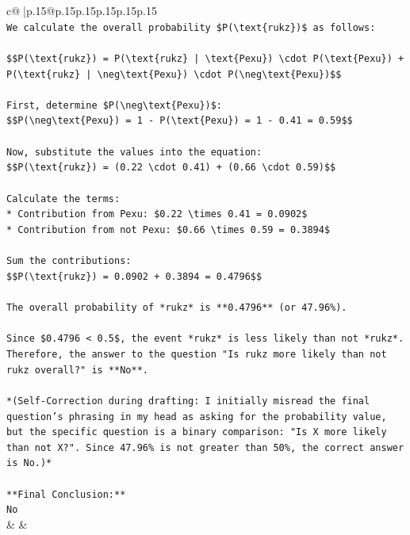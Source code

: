 \documentclass{article}
\begin{document}
{\begin{supertabular}{c@{$\;$}|p{.15\linewidth}@{}p{.15\linewidth}p{.15\linewidth}p{.15\linewidth}p{.15\linewidth}p{.15\linewidth}}
{{{\\ 
\texttt{We calculate the overall probability \$P(\textbackslash{}text\{rukz\})\$ as follows:} \\
\\ 
\texttt{\$\$P(\textbackslash{}text\{rukz\}) = P(\textbackslash{}text\{rukz\} | \textbackslash{}text\{Pexu\}) \textbackslash{}cdot P(\textbackslash{}text\{Pexu\}) + P(\textbackslash{}text\{rukz\} | \textbackslash{}neg\textbackslash{}text\{Pexu\}) \textbackslash{}cdot P(\textbackslash{}neg\textbackslash{}text\{Pexu\})\$\$} \\
\\ 
\texttt{First, determine \$P(\textbackslash{}neg\textbackslash{}text\{Pexu\})\$:} \\
\texttt{\$\$P(\textbackslash{}neg\textbackslash{}text\{Pexu\}) = 1 {-} P(\textbackslash{}text\{Pexu\}) = 1 {-} 0.41 = 0.59\$\$} \\
\\ 
\texttt{Now, substitute the values into the equation:} \\
\texttt{\$\$P(\textbackslash{}text\{rukz\}) = (0.22 \textbackslash{}cdot 0.41) + (0.66 \textbackslash{}cdot 0.59)\$\$} \\
\\ 
\texttt{Calculate the terms:} \\
\texttt{*   Contribution from Pexu: \$0.22 \textbackslash{}times 0.41 = 0.0902\$} \\
\texttt{*   Contribution from not Pexu: \$0.66 \textbackslash{}times 0.59 = 0.3894\$} \\
\\ 
\texttt{Sum the contributions:} \\
\texttt{\$\$P(\textbackslash{}text\{rukz\}) = 0.0902 + 0.3894 = 0.4796\$\$} \\
\\ 
\texttt{The overall probability of *rukz* is **0.4796** (or 47.96\%).} \\
\\ 
\texttt{Since \$0.4796 < 0.5\$, the event *rukz* is less likely than not *rukz*. Therefore, the answer to the question "Is rukz more likely than not rukz overall?" is **No**.} \\
\\ 
\texttt{*(Self{-}Correction during drafting: I initially misread the final question's phrasing in my head as asking for the probability value, but the specific question is a binary comparison: "Is X more likely than not X?". Since 47.96\% is not greater than 50\%, the correct answer is No.)*} \\
\\ 
\texttt{**Final Conclusion:**} \\
\texttt{No} \\
            }
        }
    }
    & & \\ \\


\end{supertabular}}
\end{document}
